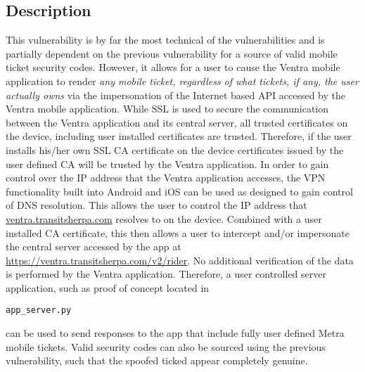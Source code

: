 \documentclass[12pt,conference]{IEEEtran}
\begin{document}
\subsection{Description}
This vulnerability is by far the most technical of the vulnerabilities and is partially dependent on the previous vulnerability for a source of valid mobile ticket security codes. However, it allows for a user to cause the Ventra mobile application to render \emph{any mobile ticket, regardless of what tickets, if any, the user actually owns} via the impersonation of the Internet based API accessed by the Ventra mobile application. While SSL is used to secure the communication between the Ventra application and its central server, all trusted certificates on the device, including user installed certificates are trusted. Therefore, if the user installs his/her own SSL CA certificate on the device certificates issued by the user defined CA will be trusted by the Ventra application. In order to gain control over the IP address that the Ventra application accesses, the VPN functionality built into Android and iOS can be used as designed to gain control of DNS resolution. This allows the user to control the IP address that \url{ventra.transitsherpa.com} resolves to on the device. Combined with a user installed CA certificate, this then allows a user to intercept and/or impersonate the central server accessed by the app at \url{https://ventra.transitsherpa.com/v2/rider}. No additional verification of the data is performed by the Ventra application. Therefore, a user controlled server application, such as proof of concept located in 
\begin{lstlisting}
app_server.py
\end{lstlisting}
can be used to send responses to the app that include fully user defined Metra mobile tickets. Valid security codes can also be sourced using the previous vulnerability, such that the spoofed ticked appear completely genuine.
\end{document}
